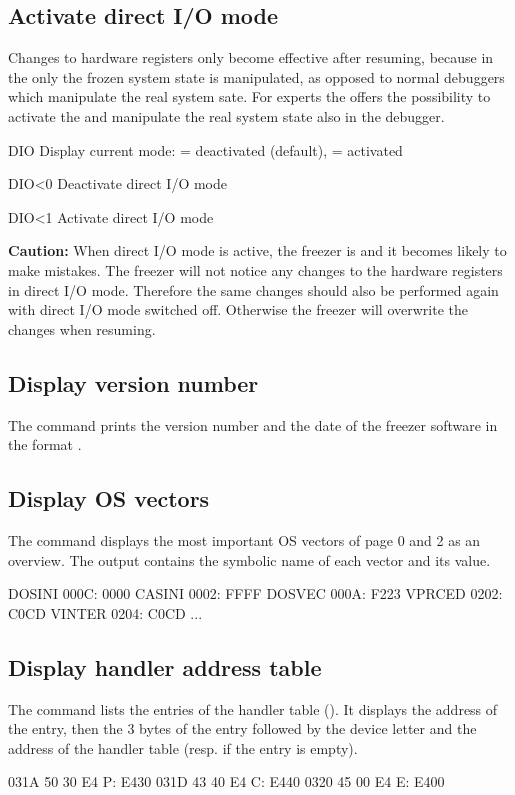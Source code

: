 \subsection{Activate direct I/O mode}
Changes to hardware registers only become effective after resuming, because in
the \linebreak \frz only the frozen system state is manipulated, as opposed to
normal debuggers which manipulate the real system sate.
For experts the \frz offers the possibility to activate the 
and manipulate the real system state also in the debugger.

\begin{fcmdlist}
\item[DIO] Display current mode:  = deactivated
(default),  = activated
\item[DIO{\textless}0] Deactivate direct I/O mode
\item[DIO{\textless}1] Activate direct I/O mode
\end{fcmdlist}

\textbf{Caution:} When direct I/O mode is active, the freezer is
 and it becomes likely to make mistakes.  The freezer will not notice any changes
to the hardware registers in direct I/O mode. Therefore the same changes should
also be performed again with direct I/O mode switched off. Otherwise the freezer
will overwrite the changes when resuming.

\subsection{Display version number}
The command  prints the version number and the date of the freezer
software in the format .

\subsection{Display OS vectors}
The  command displays the most important OS vectors of page 0 and 2  as
an overview. The output contains the symbolic name of each vector and its value.
\begin{fcode}
DOSINI 000C: 0000   CASINI 0002: FFFF
DOSVEC 000A: F223
VPRCED 0202: C0CD   VINTER 0204: C0CD
...
\end{fcode}
\subsection{Display handler address table}
The  command lists the entries of the handler table
(). It displays the address of the entry, then the 3 bytes of
the entry followed by the device letter and the address of the handler table
(resp.  if the entry is empty).
\begin{fcode}
031A  50 30 E4  P: E430
031D  43 40 E4  C: E440
0320  45 00 E4  E: E400
\end{fcode}

